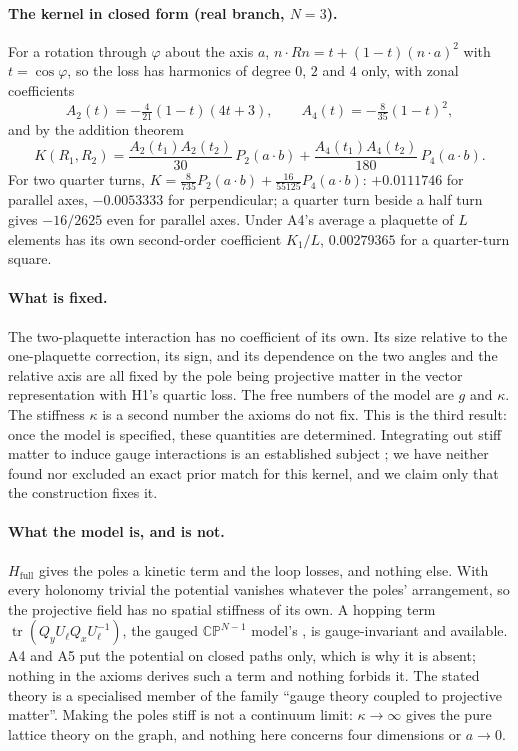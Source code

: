 \documentclass[11pt,a4paper]{article}
\theoremstyle{plain}
\theoremstyle{definition}
\theoremstyle{remark}
\newcommand{\tr}{\operatorname{tr}}
\newcommand{\CP}{\mathbb{CP}}
\begin{document}
\paragraph{The kernel in closed form (real branch, $N=3$).} For a rotation through $\varphi$ about the axis $a$, $n\cdot Rn=t+(1-t)(n\cdot a)^2$ with $t=\cos\varphi$, so the loss has harmonics of degree $0$, $2$ and $4$ only, with zonal coefficients
\begin{equation}
A_2(t)=-\tfrac{4}{21}(1-t)(4t+3),\qquad A_4(t)=-\tfrac{8}{35}(1-t)^2,
\end{equation}
and by the addition theorem
\begin{equation}\label{eq:kernel}
K(R_1,R_2)=\frac{A_2(t_1)A_2(t_2)}{30}\,P_2(a\cdot b)+\frac{A_4(t_1)A_4(t_2)}{180}\,P_4(a\cdot b).
\end{equation}
For two quarter turns, $K=\tfrac{8}{735}P_2(a\cdot b)+\tfrac{16}{55125}P_4(a\cdot b)$: $+0.0111746$ for parallel axes, $-0.0053333$ for perpendicular; a quarter turn beside a half turn gives $-16/2625$ even for parallel axes. Under A4's average a plaquette of $L$ elements has its own second-order coefficient $K_1/L$, $0.00279365$ for a quarter-turn square.

\paragraph{What is fixed.} The two-plaquette interaction has no coefficient of its own. Its size relative to the one-plaquette correction, its sign, and its dependence on the two angles and the relative axis are all fixed by the pole being projective matter in the vector representation with H1's quartic loss. The free numbers of the model are $g$ and $\kappa$. The stiffness $\kappa$ is a second number the axioms do not fix. This is the third result: once the model is specified, these quantities are determined. Integrating out stiff matter to induce gauge interactions is an established subject \cite{km,ps}; we have neither found nor excluded an exact prior match for this kernel, and we claim only that the construction fixes it.

\paragraph{What the model is, and is not.} $H_{\mathrm{full}}$ gives the poles a kinetic term and the loop losses, and nothing else. With every holonomy trivial the potential vanishes whatever the poles' arrangement, so the projective field has no spatial stiffness of its own. A hopping term $\tr(Q_yU_\ell Q_xU_\ell^{-1})$, the gauged $\CP^{N-1}$ model's \cite{cpn}, is gauge-invariant and available. A4 and A5 put the potential on closed paths only, which is why it is absent; nothing in the axioms derives such a term and nothing forbids it. The stated theory is a specialised member of the family ``gauge theory coupled to projective matter''. Making the poles stiff is not a continuum limit: $\kappa\to\infty$ gives the pure lattice theory on the graph, and nothing here concerns four dimensions or $a\to0$.
\end{document}
